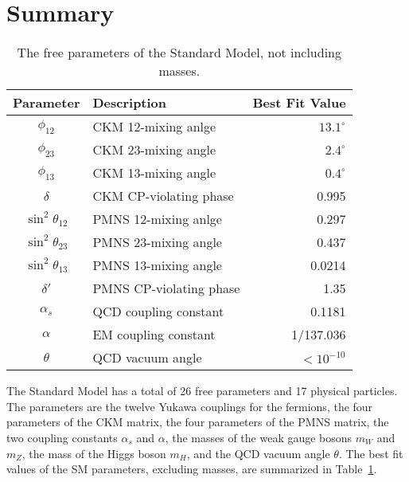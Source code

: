 \section{Summary}

\begin{table}[htbp]
\centering
\begin{tabular}{ c|l|r }
  Parameter & Description & Best Fit Value \\
  \hline
  $\phi_{12}$ & CKM 12-mixing anlge    & $13.1^\circ$ \\
  $\phi_{23}$ & CKM 23-mixing angle    & $2.4^\circ$ \\
  $\phi_{13}$ & CKM 13-mixing angle    & $0.4^\circ$ \\
  $\delta$    & CKM CP-violating phase & 0.995 \\
  \hline
  $\sin^2 \theta_{12}$ & PMNS 12-mixing anlge    & 0.297 \\
  $\sin^2 \theta_{23}$ & PMNS 23-mixing angle    & 0.437 \\
  $\sin^2 \theta_{13}$ & PMNS 13-mixing angle    & 0.0214 \\
  $\delta'$            & PMNS CP-violating phase & 1.35 \\
  \hline
  $\alpha_s$ & QCD coupling constant & 0.1181 \\
  $\alpha$ & EM coupling constant & 1/137.036 \\
  \hline
  $\theta$ & QCD vacuum angle & $< 10^{-10}$ 
\end{tabular}
\caption{ The free parameters of the Standard Model, not including masses.}
\label{tab:sm_params}
\end{table}

The Standard Model has a total of 26 free parameters and 17 physical particles.
The parameters are
the twelve Yukawa couplings for the fermions,
the four parameters of the CKM matrix,
the four parameters of the PMNS matrix,
the two coupling constants $\alpha_s$ and $\alpha$,
the masses of the weak gauge bosons $m_W$ and $m_Z$,
the mass of the Higgs boson $m_H$,
and the QCD vacuum angle $\theta$.
The best fit values of the SM parameters, excluding masses, are summarized in Table~\ref{tab:sm_params}.

